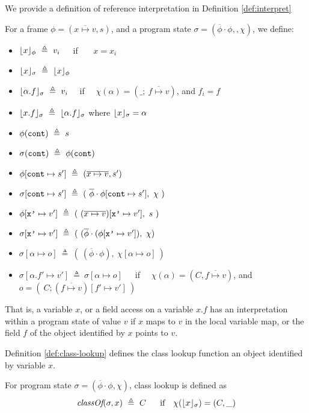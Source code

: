 {
We provide a definition of reference interpretation in Definition \ref{def:interpret}
\begin{definition}
\label{def:interpret}
For a frame $\phi= (\overline {x \mapsto v}, s)$, and a program state $\sigma = (\overline \phi \cdot \phi,, \chi)$, we   define:
\begin{itemize}
\item
$\interpret{\phi}{x}\ \triangleq\ v_i$\ \ \ if \ \ \ $x=x_i$
\item
 $\interpret{\sigma}{x}\ \triangleq\  \interpret{\phi}{x}$
\item
$\interpret{\sigma}{\alpha.f}\ \triangleq\ v_i $ \ \ if \ \ $\chi(\alpha)=(\_; \  \overline {f \mapsto v})$, and $f_i=f$
\item
$\interpret{\sigma}{x.f}\ \triangleq\ \interpret{\sigma}{\alpha.f}$ where $\lfloor x \rfloor_{\sigma}=\alpha$
\item
$\phi(\prg{cont}) \ \triangleq\ s$ 
\item
$\sigma(\prg{cont}) \ \triangleq\ \phi(\prg{cont})$\
\item
$\phi[\prg{cont}\mapsto s'] \ \triangleq\ (\overline {x \mapsto v}, s')$
\item
$\sigma[\prg{cont}\mapsto s'] \ \triangleq \ (\ {\overline \phi}\cdot \phi[\prg{cont}\mapsto s'],\  \chi\ )$ 
\item
$\phi[\prg{x'}\mapsto v'] \ \triangleq\ ( \ (\overline {x \mapsto v})[\prg{x'}\mapsto v'],\ s \ )$
\item
$\sigma[\prg{x'}\mapsto v'] \ \triangleq\ (\ (\overline {\phi} \cdot (\phi[\prg{x'}\mapsto v']), \ \chi)$ 
\item
$\sigma [\alpha \mapsto o ] \ \triangleq\ (\ (\overline {\phi} \cdot \phi), \ \chi [\alpha \mapsto o ]\ )$ 
\item
$\sigma [\alpha.f' \mapsto v' ] \ \triangleq\ \sigma [\alpha \mapsto o ] $\ \ \  if \ \  
$\chi(\alpha)=(C, {\overline {f \mapsto v}})$, and $o=(\ C;  ({\overline {f \mapsto v}})[f' \mapsto v' ]\ )$ 
\end{itemize}
\end{definition}
}
That is, a variable $x$, or a field access on a variable $x.f$ 
has an interpretation within a program state of value $v$
if $x$ maps to $v$ in the local variable map, or the field
$f$ of the object identified by $x$ points to $v$.

Definition \ref{def:class-lookup} defines the class lookup function an object 
identified by variable $x$.
\begin{definition}
\label{def:class-lookup}
For program state $\sigma = ({\overline {\phi}}\cdot\phi, \chi)$, class lookup is defined as 
$$\class{\sigma}{x}\ \triangleq\ C \ \ \ \ \ \mbox{if} \ \ \  \chi(\interpret{\sigma}{x})=(C,\_ )$$
\end{definition}


